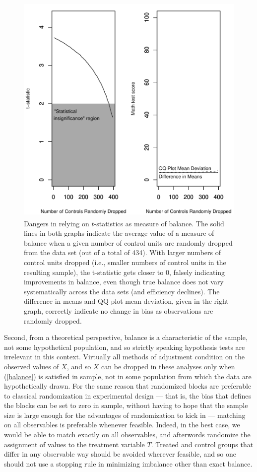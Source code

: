 \documentclass[11pt,titlepage]{article}
\begin{document}
\begin{figure}[t]
  \centering
  \includegraphics[height=4.5in]{figs/TStatPlotR0MATH}
  \caption{Dangers in relying on $t$-statistics as measure of balance.
    The solid lines in both graphs indicate the average value of a
    measure of balance when a given number of control units are
    randomly dropped from the data set (out of a total of 434).  With
    larger numbers of control units dropped (i.e., smaller numbers of
    control units in the resulting sample), the t-statistic gets
    closer to 0, falsely indicating improvements in balance, even
    though true balance does not vary systematically across the data
    sets (and efficiency declines).  The difference in means and QQ
    plot mean deviation, given in the right graph, correctly indicate
    no change in bias as observations are randomly dropped.}
  \label{f:randrop}
\end{figure}

Second, from a theoretical perspective, balance is a characteristic of
the sample, not some hypothetical population, and so strictly speaking
hypothesis tests are irrelevant in this context.  Virtually all
methods of adjustment condition on the observed values of $X$, and so
$X$ can be dropped in these analyses only when (\ref{balance}) is
satisfied in sample, not in some population from which the data are
hypothetically drawn.  For the same reason that randomized blocks are
preferable to classical randomization in experimental design --- that
is, the bias that defines the blocks can be set to zero in sample,
without having to hope that the sample size is large enough for the
advantages of randomization to kick in --- matching on all observables
is preferable whenever feasible.  Indeed, in the best case, we would
be able to match exactly on all observables, and afterwords randomize
the assignment of values to the treatment variable $T$.  Treated and
control groups that differ in any observable way should be avoided
wherever feasible, and so one should not use a stopping rule in
minimizing imbalance other than exact balance.
\end{document}
